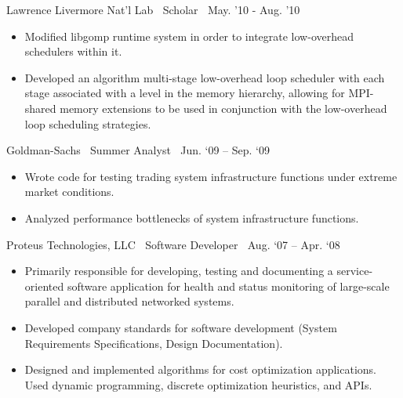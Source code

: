 {Lawrence Livermore Nat’l Lab$\>$$\>$$\>$$\>$Scholar$\>$$\>$$\>$$\>$May. '10 - Aug. '10}
\begin{itemize}
\item Modified libgomp runtime system in order to integrate low-overhead schedulers within it.
\item Developed an algorithm multi-stage low-overhead loop scheduler with each stage associated with a level in the memory hierarchy, allowing for MPI-shared memory extensions to be used in conjunction with the low-overhead loop scheduling strategies.
\end{itemize}
{Goldman-Sachs$\>\>\>\>$Summer Analyst$\>\>\>\>$Jun. ‘09 – Sep. ‘09}
\vspace*{-0.0in}
\begin{itemize}
\item Wrote code for testing trading system infrastructure functions under extreme market conditions.
\item Analyzed performance bottlenecks of system infrastructure functions.
\end{itemize}


{Proteus Technologies, LLC$\>\>\>\>$Software Developer$\>\>\>\>$Aug. ‘07 – Apr. ‘08}
\vspace*{-0.0in}
\begin{itemize} 
\item Primarily responsible for developing, testing and documenting a service-oriented software application for health and status monitoring  of large-scale parallel and distributed networked systems.
\item Developed company standards for software development (System Requirements Specifications, Design Documentation).
\item Designed and implemented algorithms for cost optimization applications. Used dynamic programming, discrete optimization heuristics, and APIs.
\end{itemize}